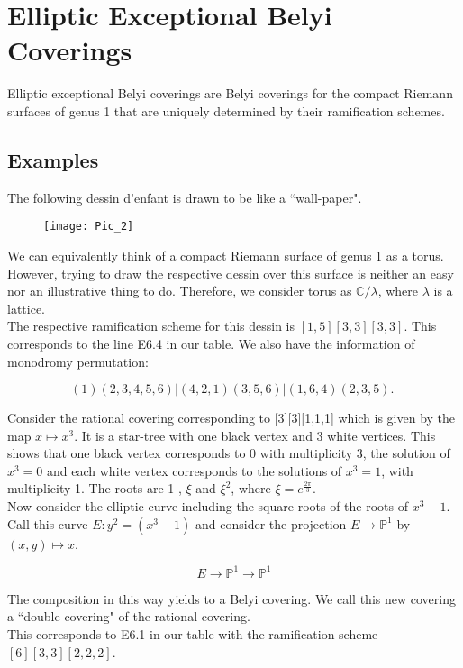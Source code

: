 \section{Elliptic Exceptional Belyi Coverings} 
Elliptic exceptional Belyi coverings are Belyi coverings for the compact Riemann surfaces of genus 1 that are uniquely determined by their ramification schemes.
\subsection{Examples}
\begin{example}
    The following dessin d'enfant is drawn to be like a ``wall-paper". 

\begin{figure}[htp]
\texttt{[image: Pic\_2]}
\end{figure}

We can equivalently think of a compact Riemann surface of genus 1 as a torus. However, trying to draw the respective dessin over this surface is neither an easy nor an illustrative thing to do. Therefore, we consider torus as $\mathbb{C} / \lambda$, where $\lambda$ is a lattice.\\

The respective ramification scheme for this dessin is $[1,5][3,3][3,3]$. This corresponds to the line E6.4 in our table. We also have the information of monodromy permutation:

$$
(1)(2,3,4,5,6)|(4,2,1)(3,5,6)|(1,6,4)(2,3,5) \text {. }
$$
\end{example}

\begin{example}    
     Consider the rational covering corresponding to [3][3][1,1,1] which is given by the map $x \mapsto x^{3}$. It is a star-tree with one black vertex and 3 white vertices. This shows that one black vertex corresponds to 0 with multiplicity 3, the solution of $x^{3}=0$ and each white vertex corresponds to the solutions of $x^{3}=1$, with multiplicity 1. The roots are 1 , $\xi$ and $\xi^{2}$, where $\xi=e^{\frac{2\pi}{3}}$. \\
     
     Now consider the elliptic curve including the square roots of the roots of $x^{3}-1$. Call this curve $E: y^{2}=\left(x^{3}-1\right)$ and consider the projection $E \rightarrow \mathbb{P}^{1}$ by $(x, y) \mapsto x$.

$$
E \rightarrow \mathbb{P}^{1} \rightarrow \mathbb{P}^{1}
$$

The composition in this way yields to a Belyi covering. We call this new covering a ``double-covering" of the rational covering.\\

This corresponds to E6.1 in our table with the ramification scheme $[6][3,3][2,2,2]$. \\
\end{example}

